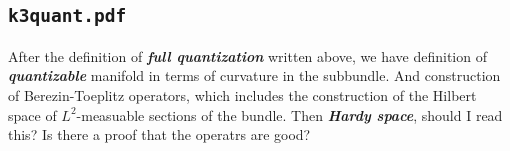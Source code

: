 \subsection{\texttt{k3quant.pdf}}

After the definition of \textit{\textbf{full quantization}} written above, we have definition of \textit{\textbf{quantizable}} manifold in terms of curvature in the subbundle. And construction of Berezin-Toeplitz operators, which includes the construction of the Hilbert space of $L^2$-measuable sections of the bundle. Then \textit{\textbf{Hardy space}}, should I read this? Is there a proof that the operatrs are good?


